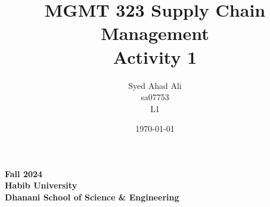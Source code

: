 \documentclass[a4paper]{exam}
\title{MGMT 323 Supply Chain Management\\
Activity 1}
\author{Syed Ahad Ali\\
sa07753\\
L1}
\date{\today}
\begin{document}
    \maketitle

    \begin{center}
        \textbf{Fall 2024}\\
        \textbf{Habib University}\\
        \textbf{Dhanani School of Science \& Engineering}\\
    \end{center}

\end{document}

